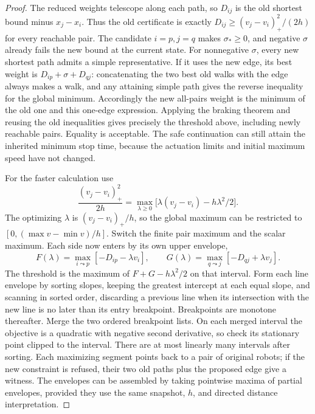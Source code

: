\documentclass[11pt]{article}
\begin{document}
\begin{proof}
The reduced weights telescope along each path, so $D_{ij}$ is the old shortest bound minus $x_j-x_i$. Thus the old certificate is exactly $D_{ij}\ge (v_j-v_i)_+^2/(2h)$ for every reachable pair. The candidate $i=p,j=q$ makes $\sigma_*\ge0$, and negative $\sigma$ already fails the new bound at the current state. For nonnegative $\sigma$, every new shortest path admits a simple representative. If it uses the new edge, its best weight is $D_{ip}+\sigma+D_{qj}$: concatenating the two best old walks with the edge always makes a walk, and any attaining simple path gives the reverse inequality for the global minimum. Accordingly the new all-pairs weight is the minimum of the old one and this one-edge expression. Applying the braking theorem and reusing the old inequalities gives precisely the threshold above, including newly reachable pairs. Equality is acceptable. The safe continuation can still attain the inherited minimum stop time, because the actuation limits and initial maximum speed have not changed.

For the faster calculation use
\[
 \frac{(v_j-v_i)_+^2}{2h}
 =\max_{\lambda\ge0}\bigl[\lambda(v_j-v_i)-h\lambda^2/2\bigr].
\]
The optimizing $\lambda$ is $(v_j-v_i)_+/h$, so the global maximum can be restricted to $[0,(\max v-\min v)/h]$. Switch the finite pair maximum and the scalar maximum. Each side now enters by its own upper envelope,
\[
 F(\lambda)=\max_{i\leadsto p}[-D_{ip}-\lambda v_i],\qquad
 G(\lambda)=\max_{q\leadsto j}[-D_{qj}+\lambda v_j].
\]
The threshold is the maximum of $F+G-h\lambda^2/2$ on that interval. Form each line envelope by sorting slopes, keeping the greatest intercept at each equal slope, and scanning in sorted order, discarding a previous line when its intersection with the new line is no later than its entry breakpoint. Breakpoints are monotone thereafter. Merge the two ordered breakpoint lists. On each merged interval the objective is a quadratic with negative second derivative, so check its stationary point clipped to the interval. There are at most linearly many intervals after sorting. Each maximizing segment points back to a pair of original robots; if the new constraint is refused, their two old paths plus the proposed edge give a witness. The envelopes can be assembled by taking pointwise maxima of partial envelopes, provided they use the same snapshot, $h$, and directed distance interpretation.
\end{proof}
\end{document}
